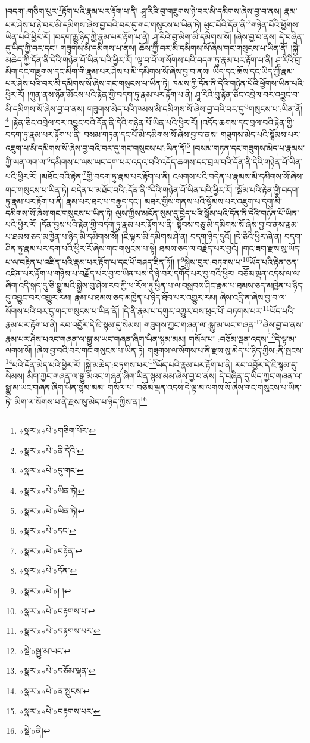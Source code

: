 །བདག་:གཅིག་པུར་\footnote{«སྣར་»«པེ་»གཅིག་པོར་}རྟོག་པའི་རྣམ་པར་རྟོག་པ་ནི། ཤཱ་རིའི་བུ་གཟུགས་ཉེ་བར་མི་དམིགས་ཞེས་བྱ་བ་ནས། རྣམ་པར་ཤེས་པ་ཉེ་བར་མི་དམིགས་ཞེས་བྱ་བའི་བར་དུ་གང་གསུངས་པ་ཡིན་ཏེ། ཕུང་པོའི་དོན་ནི་\footnote{«སྣར་»«པེ་»ནི་དེའི་}གཉེན་པོའི་ཕྱོགས་ཡིན་པའི་ཕྱིར་རོ། །བདག་རྒྱུ་ཉིད་ཀྱི་རྣམ་པར་རྟོག་པ་ནི། ཤཱ་རིའི་བུ་མིག་མི་དམིགས་སོ། །ཞེས་བྱ་བ་ནས། དེ་བཞིན་དུ་ཡིད་ཀྱི་བར་དང་། གཟུགས་མི་དམིགས་པ་ནས། ཆོས་ཀྱི་བར་མི་དམིགས་སོ་ཞེས་གང་གསུངས་པ་ཡིན་ནོ། །སྐྱེ་མཆེད་ཀྱི་དོན་ནི་དེའི་གཉེན་པོ་ཡིན་པའི་ཕྱིར་རོ། །ལྟ་བ་པོ་ལ་སོགས་པའི་བདག་ཏུ་རྣམ་པར་རྟོག་པ་ནི། ཤཱ་རིའི་བུ་མིག་དང་གཟུགས་དང་མིག་གི་རྣམ་པར་ཤེས་པ་མི་དམིགས་སོ་ཞེས་བྱ་བ་ནས། ཡིད་དང་ཆོས་དང་ཡིད་ཀྱི་རྣམ་པར་ཤེས་པའི་བར་མི་དམིགས་སོ་ཞེས་གང་གསུངས་པ་ཡིན་ཏེ། ཁམས་ཀྱི་དོན་ནི་དེའི་གཉེན་པོའི་ཕྱོགས་ཡིན་པའི་ཕྱིར་རོ། །ཀུན་ནས་ཉོན་མོངས་པའི་རྟེན་གྱི་བདག་ཏུ་རྣམ་པར་རྟོག་པ་ནི། ཤཱ་རིའི་བུ་རྟེན་ཅིང་འབྲེལ་བར་འབྱུང་བ་མི་དམིགས་སོ་ཞེས་བྱ་བ་ནས། གཟུགས་མེད་པའི་ཁམས་མི་དམིགས་སོ་ཞེས་བྱ་བའི་བར་དུ་\footnote{«སྣར་»«པེ་»དུ་གང་}གསུངས་པ་:ཡིན་ནོ།\footnote{«སྣར་»«པེ་»ཡིན་ཏེ།} །རྟེན་ཅིང་འབྲེལ་བར་འབྱུང་བའི་དོན་ནི་དེའི་གཉེན་པོ་ཡིན་པའི་ཕྱིར་རོ། །འདོད་ཆགས་དང་བྲལ་བའི་རྟེན་གྱི་བདག་ཏུ་རྣམ་པར་རྟོག་པ་ནི། བསམ་གཏན་དང་པོ་མི་དམིགས་སོ་ཞེས་བྱ་བ་ནས། གཟུགས་མེད་པའི་སྙོམས་པར་འཇུག་པ་མི་དམིགས་སོ་ཞེས་བྱ་བའི་བར་དུ་གང་གསུངས་པ་:ཡིན་ནོ།\footnote{«སྣར་»«པེ་»ཡིན་ཏེ།} །བསམ་གཏན་དང་གཟུགས་མེད་པ་རྣམས་ཀྱི་ཡན་ལག་ལ་\footnote{«སྣར་»«པེ་»དང་}དམིགས་པ་ལས་ཡང་དག་པར་འདའ་བའི་འདོད་ཆགས་དང་བྲལ་བའི་དོན་ནི་དེའི་གཉེན་པོ་ཡིན་པའི་ཕྱིར་རོ། །མཐོང་བའི་རྟེན་\footnote{«སྣར་»«པེ་»བརྟེན་}གྱི་བདག་ཏུ་རྣམ་པར་རྟོག་པ་ནི། འཕགས་པའི་བདེན་པ་རྣམས་མི་དམིགས་སོ་ཞེས་གང་གསུངས་པ་ཡིན་ཏེ། བདེན་པ་མཐོང་བའི་:དོན་ནི་\footnote{«སྣར་»«པེ་»དོན་}དེའི་གཉེན་པོ་ཡིན་པའི་ཕྱིར་རོ། །སྒོམ་པའི་རྟེན་གྱི་བདག་ཏུ་རྣམ་པར་རྟོག་པ་ནི། རྣམ་པར་ཐར་པ་བརྒྱད་དང་། མཐར་གྱིས་གནས་པའི་སྙོམས་པར་འཇུག་པ་དགུ་མི་དམིགས་སོ་ཞེས་གང་གསུངས་པ་ཡིན་ཏེ། ལུས་ཀྱིས་མངོན་སུམ་དུ་བྱེད་པའི་སྒོམ་པའི་དོན་ནི་དེའི་གཉེན་པོ་ཡིན་པའི་ཕྱིར་རོ། །དོན་བྱས་པའི་རྟེན་གྱི་བདག་ཏུ་རྣམ་པར་རྟོག་པ་ནི། སྟོབས་བཅུ་མི་དམིགས་སོ་ཞེས་བྱ་བ་ནས་རྣམ་པ་ཐམས་ཅད་མཁྱེན་པ་ཉིད་མི་དམིགས་སོ། །ཇི་ལྟར་མི་དམིགས་ཤེ་ན། བདག་ཉིད་དུའོ། །དེ་ཅིའི་ཕྱིར་ཞེ་ན། བདག་ཤིན་ཏུ་རྣམ་པར་དག་པའི་ཕྱིར་རོ་ཞེས་གང་གསུངས་པ་སྟེ། ཐམས་ཅད་ལ་བརྗོད་པར་བྱའོ། །གང་ཟག་རྫས་སུ་ཡོད་པ་ལ་བརྟེན་པ་འཛིན་པའི་རྣམ་པར་རྟོག་པ་དང་པོ་བཤད་ཟིན་ཏོ།། །།\footnote{«སྣར་»«པེ་»། །}སྐྱེས་བུར་:བཏགས་པ་\footnote{«སྣར་»«པེ་»བརྟགས་པ་}ཡོད་པའི་རྟེན་ཅན་འཛིན་པར་རྟོག་པ་གཉིས་པ་བརྗོད་པར་བྱ་བ་ཡིན་པས་དེ་ཉེ་བར་དགོད་པར་བྱ་བའི་ཕྱིར། བཅོམ་ལྡན་འདས་ལ་ལ་ཞིག་འདི་སྐད་དུ་ཅི་སྒྱུ་མའི་སྐྱེས་བུ་ཤེས་རབ་ཀྱི་ཕ་རོལ་ཏུ་ཕྱིན་པ་ལ་བསླབས་ཤིང་རྣམ་པ་ཐམས་ཅད་མཁྱེན་པ་ཉིད་དུ་འབྱུང་བར་འགྱུར་རམ། རྣམ་པ་ཐམས་ཅད་མཁྱེན་པ་ཉིད་ཐོབ་པར་འགྱུར་རམ། ཞེས་འདྲི་ན་ཞེས་བྱ་བ་ལ་སོགས་པའི་བར་དུ་གང་གསུངས་པ་ཡིན་ནོ། །དེ་ནི་རྣམ་པ་དགུར་འགྱུར་བས་ཕུང་པོ་:བཏགས་པར་\footnote{«སྣར་»«པེ་»བརྟགས་པར་}ཡོད་པའི་རྣམ་པར་རྟོག་པ་ནི། རབ་འབྱོར་དེ་ཇི་སྙམ་དུ་སེམས། གཟུགས་ཀྱང་གཞན་ལ་:སྒྱུ་མ་ཡང་གཞན་\footnote{«སྡེ་»སྒྱུ་མ་ཡང་}ཞེས་བྱ་བ་ནས་རྣམ་པར་ཤེས་པའང་གཞན་ལ་སྒྱུ་མ་ཡང་གཞན་ཞིག་ཡིན་སྙམ་མམ། གསོལ་པ། :བཅོམ་ལྡན་འདས་\footnote{«སྣར་»«པེ་»བཅོམ་ལྡན་}དེ་ལྟ་མ་ལགས་སོ། །ཞེས་བྱ་བའི་བར་གང་གསུངས་པ་ཡིན་ཏེ། གཟུགས་ལ་སོགས་པ་ནི་རྫས་སུ་མེད་པ་ཉིད་ཀྱིས་:ནི་སྤངས་\footnote{«སྣར་»«པེ་»ན་སྤུངས་}པའི་དོན་མེད་པའི་ཕྱིར་རོ། །སྐྱེ་མཆེད་:བཏགས་པར་\footnote{«སྣར་»«པེ་»བརྟགས་པར་}ཡོད་པའི་རྣམ་པར་རྟོག་པ་ནི། རབ་འབྱོར་དེ་ཇི་སྙམ་དུ་སེམས། མིག་ཀྱང་གཞན་ལ་སྒྱུ་མའང་གཞན་ཞིག་ཡིན་སྙམ་མམ་ཞེས་བྱ་བ་ནས། དེ་བཞིན་དུ་ཡིད་ཀྱང་གཞན་ལ་སྒྱུ་མ་ཡང་གཞན་ཞིག་ཡིན་སྙམ་མམ། གསོལ་པ། བཅོམ་ལྡན་འདས་དེ་ལྟ་མ་ལགས་སོ་ཞེས་གང་གསུངས་པ་ཡིན་ཏེ། མིག་ལ་སོགས་པ་ནི་རྫས་སུ་མེད་པ་ཉིད་ཀྱིས་ན།\footnote{«སྡེ་»ནི།} 